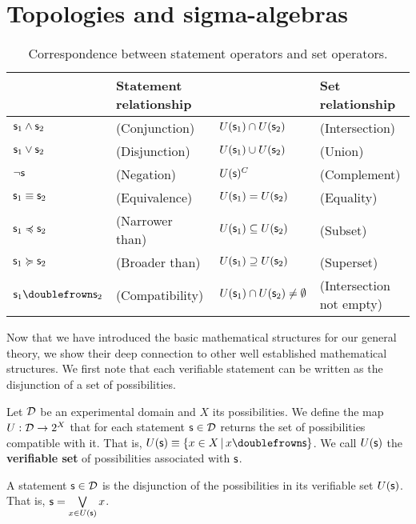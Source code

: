\documentclass[letterpaper]{article}
\begin{document}
\section{Topologies and sigma-algebras}

\begin{table*}
	\centering
	\begin{tabular}{p{} p{} p{} p{}}
		& Statement relationship & & Set relationship  \\ 
		\hline 
		$\mathsf{s}_1 \wedge \mathsf{s}_2$ & (Conjunction) & $U(\mathsf{s}_1) \cap U(\mathsf{s}_2)$ & (Intersection) \\ 
		$\mathsf{s}_1 \vee \mathsf{s}_2$ & (Disjunction) & $U(\mathsf{s}_1) \cup U(\mathsf{s}_2)$ & (Union) \\ 
		$\neg \mathsf{s}$ & (Negation) & $U(\mathsf{s})^C$ & (Complement) \\ 
		$\mathsf{s}_1 \equiv \mathsf{s}_2$ & (Equivalence) & $U(\mathsf{s}_1) = U(\mathsf{s}_2)$ & (Equality) \\ 
		$\mathsf{s}_1 \preccurlyeq \mathsf{s}_2$ & (Narrower than) & $U(\mathsf{s}_1) \subseteq U(\mathsf{s}_2)$ & (Subset) \\ 
		$\mathsf{s}_1 \succcurlyeq \mathsf{s}_2$ & (Broader than) & $U(\mathsf{s}_1) \supseteq U(\mathsf{s}_2)$ & (Superset) \\ 
		$\stmt_1 \comp \stmt_2$ & (Compatibility) & $U(\mathsf{s}_1) \cap U(\mathsf{s}_2) \neq \emptyset$ & (Intersection not empty)
	\end{tabular} 
	\caption{Correspondence between statement operators and set operators.}\label{tab:statement_set}
\end{table*}

Now that we have introduced the basic mathematical structures for our general theory, we show their deep connection to other well established mathematical structures. We first note that each verifiable statement can be written as the disjunction of a set of possibilities.

\begin{defn}
	Let $\mathcal{D}$ be an experimental domain and $X$ its possibilities. We define the map $U : \mathcal{D} \rightarrow 2^X$ that for each statement $\mathsf{s} \in \mathcal{D}$ returns the set of possibilities compatible with it. That is, $U(\stmt)\equiv\{ x \in X \, | \, x \comp \stmt\}$. We call $U(\mathsf{s})$ the \textbf{verifiable set} of possibilities associated with $\mathsf{s}$.
\end{defn}

\begin{prop}
	A statement $\mathsf{s} \in \mathcal{D}$ is the disjunction of the possibilities in its verifiable set $U(\mathsf{s})$. That is, $\mathsf{s}=\bigvee\limits_{x \in U(\mathsf{s})} x$.
\end{prop}
\end{document}
